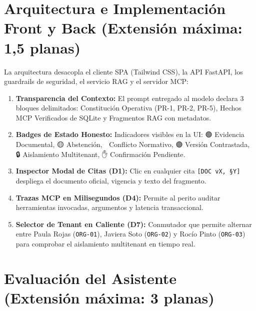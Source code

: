\documentclass[11pt,letterpaper]{article}
\begin{document}
\newpage

\section{Arquitectura e Implementación Front y Back (Extensión máxima: 1,5 planas)}

La arquitectura desacopla el cliente SPA (Tailwind CSS), la API FastAPI, los guardrails de seguridad, el servicio RAG y el servidor MCP:
\begin{enumerate}
    \item \textbf{Transparencia del Contexto:} El prompt entregado al modelo declara 3 bloques delimitados: Constitución Operativa (PR-1, PR-2, PR-5), Hechos MCP Verificados de SQLite y Fragmentos RAG con metadatos.
    \item \textbf{Badges de Estado Honesto:} Indicadores visibles en la UI: 🟢 Evidencia Documental, 🟡 Abstención, 🔴 Conflicto Normativo, 🟣 Versión Contrastada, 🔒 Aislamiento Multitenant, ✋ Confirmación Pendiente.
    \item \textbf{Inspector Modal de Citas (D1):} Clic en cualquier cita \texttt{[DOC vX, §Y]} despliega el documento oficial, vigencia y texto del fragmento.
    \item \textbf{Trazas MCP en Milisegundos (D4):} Permite al perito auditar herramientas invocadas, argumentos y latencia transaccional.
    \item \textbf{Selector de Tenant en Caliente (D7):} Conmutador que permite alternar entre Paula Rojas (\texttt{ORG-01}), Javiera Soto (\texttt{ORG-02}) y Rocío Pinto (\texttt{ORG-03}) para comprobar el aislamiento multitenant en tiempo real.
\end{enumerate}

\newpage

\section{Evaluación del Asistente (Extensión máxima: 3 planas)}
\end{document}
